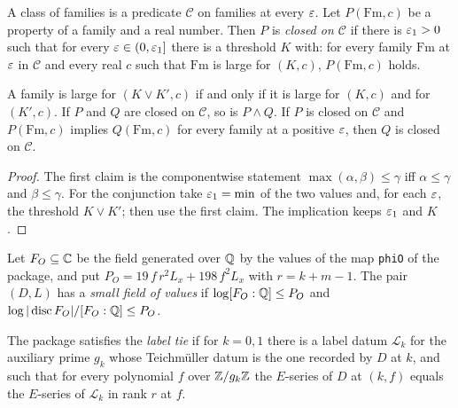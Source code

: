 \begin{definition}\label{geob:closed}
A class of families is a predicate $\mathcal C$ on families at every $\varepsilon$.
Let $P(\mathrm{Fm},c)$ be a property of a family and a real number. Then $P$ is
\emph{closed on $\mathcal C$} if there is $\varepsilon_1>0$ such that for every
$\varepsilon\in(0,\varepsilon_1]$ there is a threshold $K$ with: for every family
$\mathrm{Fm}$ at $\varepsilon$ in $\mathcal C$ and every real $c$ such that
$\mathrm{Fm}$ is large for $(K,c)$, $P(\mathrm{Fm},c)$ holds.
\end{definition}

\begin{lemma}\label{geob:closed-and}
A family is large for $(K\vee K',c)$ if and only if it is large for $(K,c)$
and for $(K',c)$. If $P$ and $Q$ are closed on $\mathcal C$, so is $P\wedge Q$.
If $P$ is closed on $\mathcal C$ and $P(\mathrm{Fm},c)$ implies
$Q(\mathrm{Fm},c)$ for every family at a positive $\varepsilon$, then $Q$ is closed
on $\mathcal C$.
\end{lemma}
\begin{proof}
The first claim is the componentwise statement $\max(\alpha,\beta)\le\gamma$
iff $\alpha\le\gamma$ and $\beta\le\gamma$. For the conjunction take
$\varepsilon_1=\min$ of the two values and, for each $\varepsilon$, the threshold
$K\vee K'$; then use the first claim. The implication keeps $\varepsilon_1$ and $K$.
\end{proof}

\begin{definition}\label{geob:fieldsmall}
Let $F_O\subseteq\mathbb{C}$ be the field generated over $\mathbb{Q}$ by the values of the
map \texttt{phiO} of the package, and put
$P_O=19\,f\,r^2L_x+198\,f^2L_x$ with $r=k+m-1$. The pair $(D,L)$ has a
\emph{small field of values} if $\log[F_O:\mathbb{Q}]\le P_O$ and
$\log|\operatorname{disc}F_O|/[F_O:\mathbb{Q}]\le P_O$.
\end{definition}

\begin{definition}\label{geob:esertie}
The package satisfies the \emph{label tie} if for $k=0,1$ there is a label
datum $\mathcal L_k$ for the auxiliary prime $g_k$ whose Teichmüller datum is the
one recorded by $D$ at $k$, and such that for every polynomial $f$ over
$\mathbb{Z}/g_k\mathbb{Z}$ the $E$-series of $D$ at $(k,f)$ equals the $E$-series of
$\mathcal L_k$ in rank $r$ at $f$.
\end{definition}

